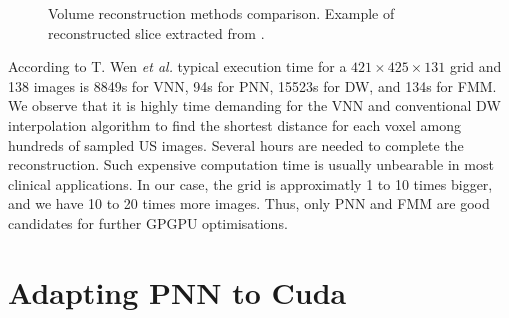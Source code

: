 \documentclass[12pt,journal,compsoc]{IEEEtran}
\begin{document}
\begin{figure}[h!]
\centering
{}
\hfil
{}
\hfil
{}
\hfil
{}
\caption{Volume reconstruction methods comparison. Example of reconstructed slice extracted from \cite{2}.}
\label{algo_comparison}
\end{figure}

According to T. Wen \textit{et al.}\cite{2} typical execution time for a $421\times425\times131$ grid and 138 images is 8849s for VNN, 94s for PNN, 15523s for DW, and 134s for FMM.
We observe that it is highly time demanding for the VNN and conventional DW interpolation algorithm to find the shortest distance for each voxel among hundreds of sampled US images. Several hours are needed to complete the reconstruction. Such expensive computation time is usually unbearable in most clinical applications. In our case, the grid is approximatly 1 to 10 times bigger, and we have 10 to 20 times more images. Thus, only PNN and FMM are good candidates for further GPGPU optimisations.

\section{Adapting PNN to Cuda}
\end{document}
